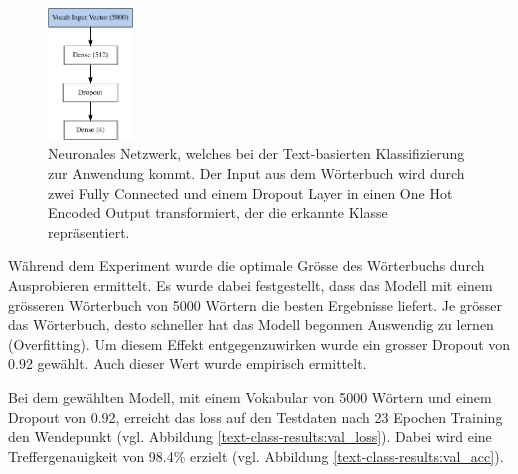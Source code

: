 \begin{figure}[h!]
    \captionsetup{width=.8\linewidth}
    \caption[Neuronales Netzwerk, welches bei der Text-basierten Klassifizierung zur Anwendung kommt]{Neuronales Netzwerk, welches bei der Text-basierten Klassifizierung zur Anwendung kommt. Der Input aus dem Wörterbuch wird durch zwei Fully Connected und einem Dropout Layer in einen One Hot Encoded Output transformiert, der die erkannte Klasse repräsentiert.}
    \label{text-classification-model}
    \centering
    \includegraphics[width=0.2\textwidth]{graphics/text-classification/model.pdf}

\end{figure} 

Während dem Experiment wurde die optimale Grösse des Wörterbuchs durch Ausprobieren ermittelt. Es wurde dabei festgestellt, dass das Modell mit einem grösseren Wörterbuch von 5000 Wörtern die besten Ergebnisse liefert. Je grösser das Wörterbuch, desto schneller hat das Modell begonnen Auswendig zu lernen (Overfitting). Um diesem Effekt entgegenzuwirken wurde ein grosser Dropout von 0.92 gewählt. Auch dieser Wert wurde empirisch ermittelt.

Bei dem gewählten Modell, mit einem Vokabular von 5000 Wörtern und einem Dropout von 0.92, erreicht das loss auf den Testdaten nach 23 Epochen Training den Wendepunkt (vgl. Abbildung \ref{text-class-results:val_loss}). Dabei wird eine Treffergenauigkeit von 98.4\% erzielt (vgl. Abbildung \ref{text-class-results:val_acc}). 

